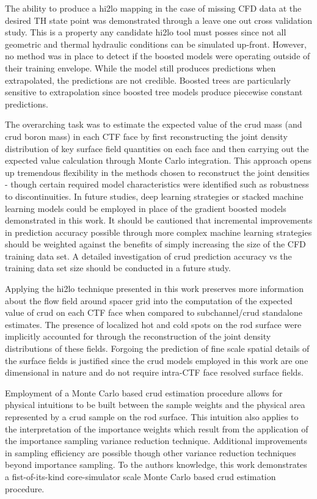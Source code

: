 The ability to produce a hi2lo mapping in the case of missing CFD data at the desired TH state point was demonstrated through a leave one out cross validation study.  This is a property any candidate hi2lo tool must posses since not all geometric and thermal hydraulic conditions can be simulated up-front. However, no method was in place to detect if the boosted models were operating outside of their training envelope.  While the model still produces predictions when extrapolated, the predictions are not credible.  Boosted trees are particularly sensitive to extrapolation since boosted tree models produce piecewise constant predictions.

The overarching task was to estimate the expected value of the crud mass (and crud boron mass) in each CTF face by first reconstructing the joint density distribution of key surface field quantities on each face and then carrying out the expected value calculation through Monte Carlo integration.  This approach opens up tremendous flexibility in the methods chosen to reconstruct the joint densities - though certain required model characteristics were identified such as robustness to discontinuities.  In future studies, deep learning strategies or stacked machine learning models could be employed in place of the gradient boosted models demonstrated in this work.  It should be cautioned that incremental improvements in prediction accuracy possible through more complex  machine learning strategies should be weighted against the benefits of simply increasing the size of the CFD training data set.  A detailed investigation of crud prediction accuracy vs the training data set size should be conducted in a future study.

Applying the hi2lo technique presented in this work preserves more information about the flow field around spacer grid into the computation of the expected value of crud on each CTF face when compared to subchannel/crud standalone estimates.  The presence of localized hot and cold spots on the rod surface were implicitly accounted for through the reconstruction of the joint density distributions of these fields.  Forgoing the prediction of fine scale spatial details of the surface fields is justified since the crud models employed in this work are one dimensional in nature and do not require intra-CTF face resolved surface fields.

Employment of a Monte Carlo based crud estimation procedure allows for physical intuitions to be built between the sample weights and the physical area represented by a crud sample on the rod surface.  This intuition also applies to the interpretation of the importance weights which result from the application of the importance sampling variance reduction technique.  Additional improvements in sampling efficiency are possible though other variance reduction techniques beyond importance sampling.  To the authors knowledge, this work demonstrates a fist-of-its-kind core-simulator scale Monte Carlo based crud estimation procedure.

